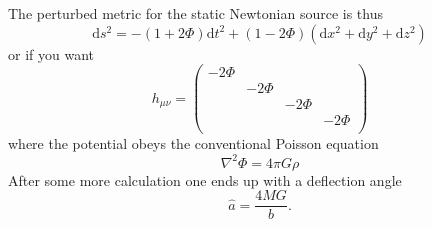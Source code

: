 \documentclass[10pt,landscape,a4paper]{article}
\newcommand{\intgr} {\mathrm{d}}
\newcommand{\munu} {\mu\nu}
\begin{document}
\begin{multicols}{3}
The perturbed metric for the static Newtonian source is thus
\begin{equation}
\intgr s^2 = -(1+2\Phi)\intgr t^2 + (1-2\Phi)(\intgr x^2 +\intgr y^2 +\intgr z^2)
\end{equation}
or if you want
\begin{equation}
h_{\munu} = \begin{pmatrix}
-2\Phi&&&\\
&-2\Phi&&\\
&&-2\Phi&\\
&&&-2\Phi\\
\end{pmatrix}
\end{equation}
where the potential obeys the conventional Poisson equation
\begin{equation}
\nabla^2 \Phi = 4\pi G\rho
\end{equation}
After some more calculation one ends up with a deflection angle
\begin{equation}
\hat{a} = \frac{4MG}{b}.
\end{equation}

\end{multicols}
\end{document}
